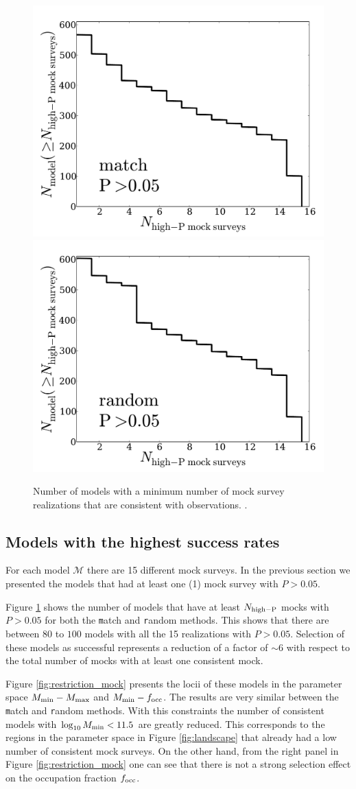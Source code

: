 \documentclass[usenatbib]{mn2e}
\begin{document}
\begin{figure}
\begin{center}
\includegraphics[width=0.46\linewidth,angle=0]{./plots/Fig4_match_P5.pdf}
\hspace{5mm}
\includegraphics[width=0.46\linewidth,angle=0]{./plots/Fig4_random_P5.pdf}
\end{center} 
\caption{ Number of models with a minimum number of mock survey
  realizations that are consistent with observations.
  \label{fig:high_success_rate}.}  
\end{figure}
 
\subsection{Models with the highest success rates}

For each model ${\mathcal M}$ there are 15 different mock surveys. In the
previous section we presented the models that had at least one (1)
mock survey with $P>0.05$.

Figure \ref{fig:high_success_rate} shows the number of models
that have at least $N_{\rm high-P}$ mocks with $P>0.05$ for both the
{\texttt  match} and {\texttt random} methods.  This shows that there
are between $80$ to $100$ models with all the 15 realizations with
$P>0.05$. Selection of these models as successful represents a
reduction of a factor of $\sim 6$ with respect to the total number of
mocks with at least one consistent mock.  

Figure \ref{fig:restriction_mock} presents the locii of these models
in the parameter space $M_{\rm min}-M_{\rm max}$ and $M_{\rm
  min}-f_{\rm occ}$. The results are very similar between the {\texttt
  match} and {\texttt random} methods. With this constraints the
number of consistent models with  $\log_{10}M_{\rm min}< 11.5$ are
greatly reduced. This corresponds to the regions in the parameter
space in Figure \ref{fig:landscape} that already had a low number of
consistent mock surveys. On the other hand, from the right panel in
Figure \ref{fig:restriction_mock} one can see that there is not a
strong selection effect on the occupation fraction $f_{\rm occ}$.  
\end{document}
